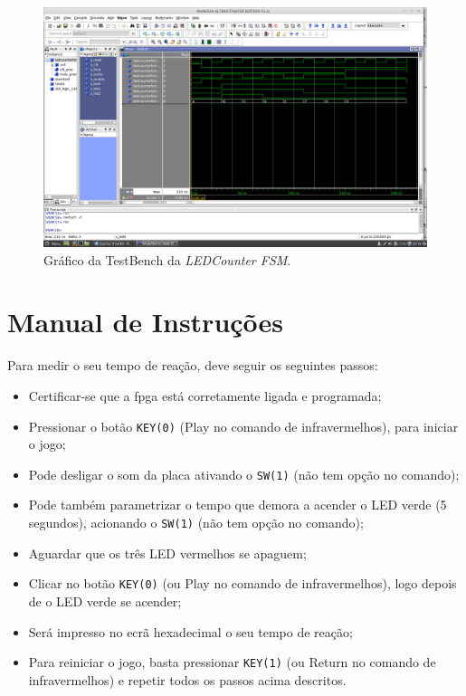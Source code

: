 \documentclass[a4paper,11pt,onecolumn]{report}
\begin{document}
\begin{figure}[h]
\centerline{\includegraphics[scale=0.33]{Images/LEDCounterFSMTB}}
\caption{Gráfico da TestBench da \textit{LEDCounter FSM}.}
\label{figledcounterfsmtb}
\end{figure}

\section{Manual de Instruções}
Para medir o seu tempo de reação, deve seguir os seguintes passos:
\begin{itemize}
\item Certificar-se que a \ac{fpga} está corretamente ligada e programada;
\item Pressionar o botão \texttt{KEY(0)} (Play no comando de infravermelhos), para iniciar o jogo;
\item Pode desligar o som da placa ativando o \texttt{SW(1)} (não tem opção no comando);
\item Pode também parametrizar o tempo que demora a acender o LED verde (5 segundos), acionando o \texttt{SW(1)} (não tem opção no comando);
\item Aguardar que os três LED vermelhos se apaguem;
\item Clicar no botão \texttt{KEY(0)} (ou Play no comando de infravermelhos), logo depois de o LED verde se acender;
\item Será impresso no ecrã hexadecimal o seu tempo de reação;
\item Para reiniciar o jogo, basta pressionar \texttt{KEY(1)} (ou Return no comando de infravermelhos) e repetir todos os passos acima descritos.
\end{itemize}
\end{document}
